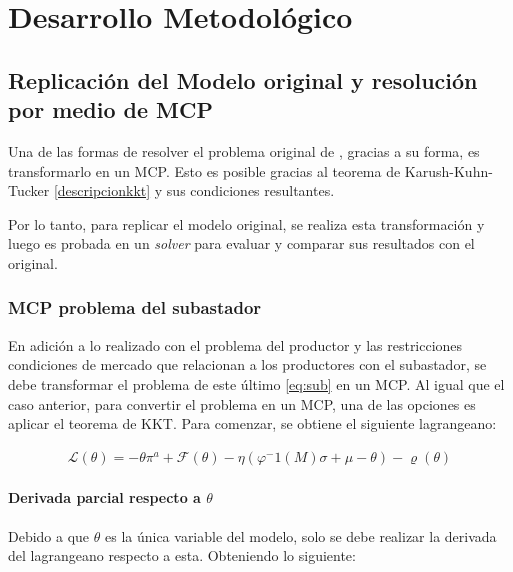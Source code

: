 
\chapter{Desarrollo Metodológico} \label{MCP:subastador} %


\section{Replicación del Modelo original y resolución por medio de MCP}

Una de las formas de resolver el problema original de , gracias a su forma, es transformarlo en un MCP. Esto es posible gracias al teorema de Karush-Kuhn-Tucker \ref{descripcionkkt} y sus condiciones resultantes. 
\vspace{2.5mm}

Por lo tanto, para replicar el modelo original, se realiza esta transformación y luego es probada en un \textit{solver} para evaluar y comparar sus resultados con el original.

\subsection{MCP problema del subastador} \label{MCPsubastador}

En adición a lo realizado con el problema del productor y las restricciones condiciones de mercado que relacionan a los productores con el subastador, se debe transformar el problema de este último \ref{eq:sub} en un MCP. Al igual que el caso anterior, para convertir el problema en un MCP, una de las opciones es aplicar el teorema de KKT. Para comenzar, se obtiene el siguiente lagrangeano:

\footnotesize{
\begin{align}
\mathcal{L}(\theta) = -\theta\pi^a + \mathcal{F}(\theta) - \eta (\varphi^-1(M)\sigma+\mu-\theta) - \varrho(\theta)  \label{eq:lagrange2}
\end{align}}

\subsubsection{Derivada parcial respecto a $\theta$}

Debido a que $\theta$ es la única variable del modelo, solo se debe realizar la derivada del lagrangeano respecto a esta. Obteniendo lo siguiente:

